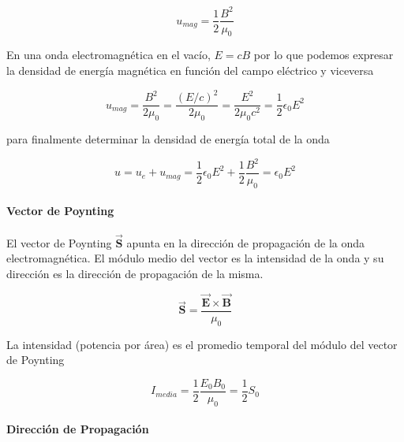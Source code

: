 \documentclass{tufte-handout}
\begin{document}
\begin{equation}
u_{mag} = \displaystyle\frac{1}{2}\displaystyle\frac{B^2}{\mu_0}
\end{equation}

En una onda electromagnética en el vacío, $E = cB$ por lo que podemos expresar la densidad de energía magnética en función del campo eléctrico y viceversa

\begin{equation}
u_{mag} = \displaystyle\frac{B^2}{2\mu_0} = \displaystyle\frac{(E/c)^2}{2\mu_0} = \displaystyle\frac{E^2}{2\mu_0c^2} = \displaystyle\frac{1}{2}\epsilon_0 E^2
\end{equation}

para finalmente determinar la densidad de energía total de la onda

\begin{equation}
u = u_e + u_{mag} = \displaystyle\frac{1}{2}\epsilon_0 E^2 + \displaystyle\frac{1}{2}\displaystyle\frac{B^2}{\mu_0} = \epsilon_0E^2
\end{equation}

\paragraph{Vector de Poynting}

El vector de Poynting $\mathbf{\vec{S}}$ apunta en la dirección de propagación de la onda electromagnética. El módulo medio del vector es la intensidad de la onda y su dirección es la dirección de propagación de la misma.

\begin{equation}
\mathbf{\vec{S}} = \displaystyle\frac{\mathbf{\vec{E}} \times \mathbf{\vec{B}}}{\mu_0}
\end{equation}

La intensidad (potencia por área) es el promedio temporal del módulo del vector de Poynting

\begin{equation}
I_{media} = \displaystyle\frac{1}{2}\displaystyle\frac{E_0B_0}{\mu_0} = \displaystyle\frac{1}{2}S_0
\end{equation}

\paragraph{Dirección de Propagación}
\end{document}
